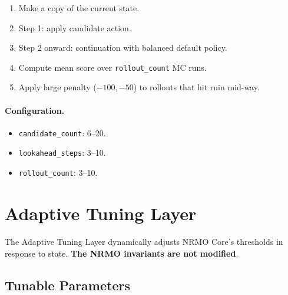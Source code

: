 \begin{enumerate}
\item Make a copy of the current state.
\item Step 1: apply candidate action.
\item Step 2 onward: continuation with balanced default policy.
\item Compute mean score over \texttt{rollout\_count} MC runs.
\item Apply large penalty ($-100, -50$) to rollouts that hit ruin
mid-way.
\end{enumerate}

\paragraph{Configuration.}
\begin{itemize}
\item \texttt{candidate\_count}: 6--20.
\item \texttt{lookahead\_steps}: 3--10.
\item \texttt{rollout\_count}: 3--10.
\end{itemize}

\section{Adaptive Tuning Layer}
\label{sec:vnext-adaptive-tuning}

The Adaptive Tuning Layer dynamically adjusts NRMO Core's thresholds
in response to state. \textbf{The NRMO invariants are not modified}.

\subsection{Tunable Parameters}
\label{sec:vnext-tunable-params}

